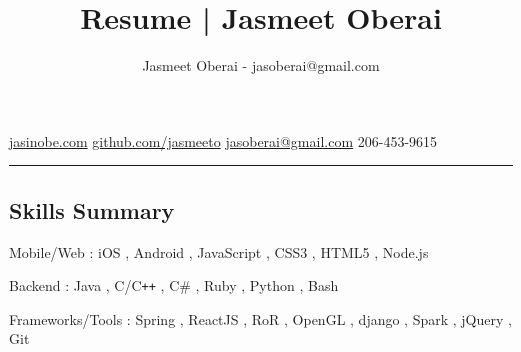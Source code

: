\documentclass[11pt,letterpaper]{article}
\def\labelitemi{\textbf{$\rightarrow$}}
\newcommand{\subsectioncustomend}[1]
{
\vspace{-0.8em}
\subsection*{#1}
}
\newcommand{\subsectioncustom}[1]
{
\hrule
\subsectioncustomend{#1}
}
\newcommand{\CPP}{C\texttt{++}}
\begin{document}
\font=3.0pt


\title{Resume |  Jasmeet Oberai }


\author{Jasmeet Oberai - jasoberai@gmail.com }


\begin{center}
{}


\end{center}


\begin{center}
\Mundus
\hspace{0.1em}
\href{http://www.jasinobe.com}{jasinobe.com} 
\faGithub*
\href{https://github.com/jasmeeto}{github.com/jasmeeto} 
\Letter
\hspace{0.1em}
\href{mailto:jasoberai@gmail.com}{jasoberai@gmail.com}
\Mobilefone
\hspace{0.1em}
206-453-9615 
\end{center}


\subsectioncustom{Skills Summary}

\begin{itemize*}
        \item{
            Mobile/Web :
                 iOS
                ,  Android
                ,  JavaScript
                ,  CSS3
                ,  HTML5
                ,  Node.js
        }
        \item{
            Backend :
                 Java
                ,  C/\CPP
                ,  C\#
                ,  Ruby
                ,  Python
                ,  Bash
        }
        \item{
            Frameworks/Tools :
                 Spring
                ,  ReactJS
                ,  RoR
                ,  OpenGL
                ,  django
                ,  Spark
                ,  jQuery
                ,  Git
        }
\end{itemize*}
\end{document}

